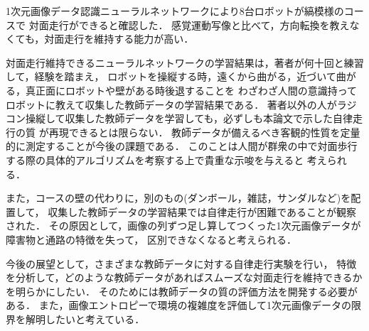 1次元画像データ認識ニューラルネットワークにより8台ロボットが縞模様のコースで
対面走行ができると確認した．
感覚運動写像と比べて，方向転換を教えなくても，対面走行を維持する能力が高い．

対面走行維持できるニューラルネットワークの学習結果は，著者が何十回と練習して，経験を踏まえ，
ロボットを操縦する時，遠くから曲がる，近づいて曲がる，真正面にロボットや壁がある時後退することを
わざわざ人間の意識持ってロボットに教えて収集した教師データの学習結果である．
著者以外の人がラジコン操縦して収集した教師データを学習しても，必ずしも本論文で示した自律走行の質
が再現できるとは限らない．
教師データが備えるべき客観的性質を定量的に測定することが今後の課題である．
このことは人間が群衆の中で対面歩行する際の具体的アルゴリズムを考察する上で貴重な示唆を与えると
考えられる．

また，コースの壁の代わりに，別のもの(ダンボール，雑誌，サンダルなど)を配置して，
収集した教師データの学習結果では自律走行が困難であることが観察された．
その原因として，画像の列ずつ足し算してつくった1次元画像データが障害物と通路の特徴を失って，
区別できなくなると考えられる．

今後の展望として，さまざまな教師データに対する自律走行実験を行い，
特徴を分析して，どのような教師データがあればスムーズな対面走行を維持できるかを明らかにしたい．
そのためには教師データの質の評価方法を開発する必要がある．
また，画像エントロピーで環境の複雑度を評価して1次元画像データの限界を解明したいと考えている．

